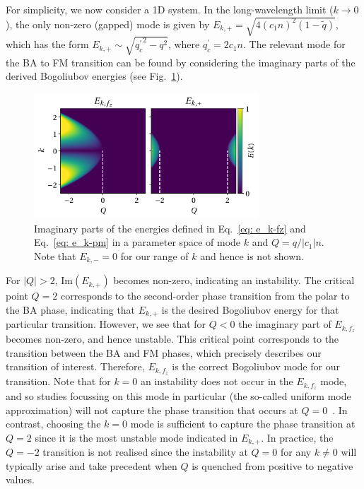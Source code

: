 For simplicity, we now consider a 1D system.
In the long-wavelength limit (\(k \rightarrow 0\)), the only non-zero (gapped)
mode is given by \(E_{k, +}= \sqrt{4{(c_1n)}^2(1-\tilde{q})}\), which has the
form \(E_{k, +} \sim \sqrt{{q_c^\prime}^2 - q^2}\), where
\(q_c^\prime = 2c_1n\).
The relevant mode for the BA to FM transition can be found by considering the
imaginary parts of the derived Bogoliubov energies (see
Fig.~\ref{fig: dens-spin-energies}).
\begin{figure}[tb]
    \centering
    \includegraphics[width=0.75\textwidth]{gfx/ch-spin1/bogoliubov_energies.pdf}
    \caption[Real and imaginary parts of the Bogoliubov energies for the
        broken-axisymmetry phase of a spin-1 BEC]
    {\label{fig: dens-spin-energies}Imaginary parts of the energies defined in
    Eq.~\eqref{eq: e_k-fz} and Eq.~\eqref{eq: e_k-pm} in a parameter space of
    mode \(k\) and \( Q=q/|c_1|n \).
    Note that \(E_{k, -} = 0\) for our range of \(k\) and hence is not shown.}
\end{figure}
For \(|Q|>2\), \(\text{Im}(E_{k, +})\) becomes non-zero, indicating an
instability.
The critical point \(Q = 2\) corresponds to the second-order phase transition
from the polar to the BA phase, indicating that \(E_{k, +}\) is the desired
Bogoliubov energy for that particular transition.
However, we see that for \(Q<0\) the imaginary part of \(E_{k, f_z}\) becomes
non-zero, and hence unstable.
This critical point corresponds to the transition between the BA and FM phases,
which precisely describes our transition of interest.
Therefore, \(E_{k, f_z}\) is the correct Bogoliubov mode for our transition.
Note that for \(k=0\) an instability does not occur in the \(E_{k, f_z}\) mode,
and so studies focussing on this mode in particular (the so-called uniform mode
approximation) will not capture the phase transition that occurs at
\(Q=0\)~\cite{Matuszewski2009, Qiu2020, Mirkhalaf2021}.
In contrast, choosing the \(k=0\) mode is sufficient to capture the phase
transition at \(Q=2\) since it is the most unstable mode indicated in
\(E_{k, +}\).
In practice, the \(Q=-2\) transition is not realised since the instability at
\(Q=0\) for any \(k \neq 0\) will typically arise and take precedent when
\(Q\) is quenched from positive to negative values.

